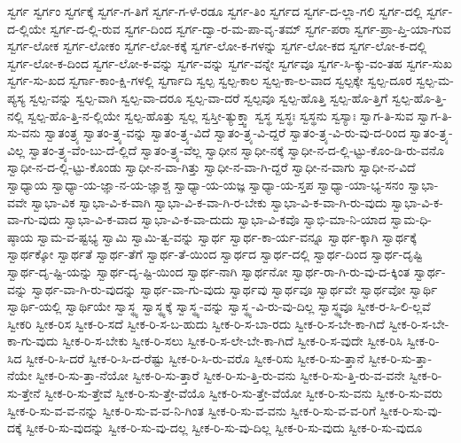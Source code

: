{ಸ್ವರ್ಗ
ಸ್ವರ್ಗಂ
ಸ್ವರ್ಗಕ್ಕೆ
ಸ್ವರ್ಗ-ಗ-ತಿಗೆ
ಸ್ವರ್ಗ-ಗ-ಳೆ-ರಡೂ
ಸ್ವರ್ಗ-ತಿಂ
ಸ್ವರ್ಗದ
ಸ್ವರ್ಗ-ದ-ಲ್ಲಾ-ಗಲಿ
ಸ್ವರ್ಗ-ದಲ್ಲಿ
ಸ್ವರ್ಗ-ದ-ಲ್ಲಿಯೇ
ಸ್ವರ್ಗ-ದ-ಲ್ಲಿ-ರುವ
ಸ್ವರ್ಗ-ದಿಂದ
ಸ್ವರ್ಗ-ದ್ವಾ-ರ-ಮ-ಪಾ-ವೃ-ತಮ್
ಸ್ವರ್ಗ-ಪರಾ
ಸ್ವರ್ಗ-ಪ್ರಾ-ಪ್ತಿ-ಯಾ-ಗುವ
ಸ್ವರ್ಗ-ಲೋಕ
ಸ್ವರ್ಗ-ಲೋಕಂ
ಸ್ವರ್ಗ-ಲೋ-ಕಕ್ಕೆ
ಸ್ವರ್ಗ-ಲೋ-ಕ-ಗಳನ್ನು
ಸ್ವರ್ಗ-ಲೋ-ಕದ
ಸ್ವರ್ಗ-ಲೋ-ಕ-ದಲ್ಲಿ
ಸ್ವರ್ಗ-ಲೋ-ಕ-ದಿಂದ
ಸ್ವರ್ಗ-ಲೋ-ಕ-ವನ್ನು
ಸ್ವರ್ಗ-ವನ್ನು
ಸ್ವರ್ಗ-ವನ್ನೇ
ಸ್ವರ್ಗವೂ
ಸ್ವರ್ಗ-ಸಿ-ಕ್ಕು-ವಂ-ತಹ
ಸ್ವರ್ಗ-ಸುಖ
ಸ್ವರ್ಗ-ಸು-ಖದ
ಸ್ವರ್ಗಾ-ಕಾಂ-ಕ್ಷಿ-ಗಳಲ್ಲಿ
ಸ್ವರ್ಗಾದಿ
ಸ್ವಲ್ಪ
ಸ್ವಲ್ಪ-ಕಾಲ
ಸ್ವಲ್ಪ-ಕಾ-ಲ-ವಾದ
ಸ್ವಲ್ಪಕ್ಕೇ
ಸ್ವಲ್ಪ-ದೂರ
ಸ್ವಲ್ಪ-ಮ-ಪ್ಯಸ್ಯ
ಸ್ವಲ್ಪ-ವನ್ನು
ಸ್ವಲ್ಪ-ವಾಗಿ
ಸ್ವಲ್ಪ-ವಾ-ದರೂ
ಸ್ವಲ್ಪ-ವಾ-ದರೆ
ಸ್ವಲ್ಪವೂ
ಸ್ವಲ್ಪ-ಹೊತ್ತಿ
ಸ್ವಲ್ಪ-ಹೊ-ತ್ತಿಗೆ
ಸ್ವಲ್ಪ-ಹೊ-ತ್ತಿ-ನಲ್ಲಿ
ಸ್ವಲ್ಪ-ಹೊ-ತ್ತಿ-ನ-ಲ್ಲಿಯೇ
ಸ್ವಲ್ಪ-ಹೊತ್ತು
ಸ್ವಲ್ಲ
ಸ್ವಸ್ತೀ-ತ್ಯುಕ್ತ್ವಾ
ಸ್ವಸ್ಥ
ಸ್ವಸ್ಥಃ
ಸ್ವಸ್ಥನು
ಸ್ವಸ್ಯಾಃ
ಸ್ವಾಗ-ತಿ-ಸುವ
ಸ್ವಾಗ-ತಿ-ಸು-ವನು
ಸ್ವಾತಂತ್ರ್ಯ
ಸ್ವಾತಂ-ತ್ರ್ಯ-ವನ್ನು
ಸ್ವಾತಂ-ತ್ರ್ಯ-ವಿದೆ
ಸ್ವಾತಂ-ತ್ರ್ಯ-ವಿ-ದ್ದರೆ
ಸ್ವಾತಂ-ತ್ರ್ಯ-ವಿ-ರು-ವು-ದ-ರಿಂದ
ಸ್ವಾತಂ-ತ್ರ್ಯ-ವಿಲ್ಲ
ಸ್ವಾತಂ-ತ್ರ್ಯ-ವೆಂ-ಬು-ದೆ-ಲ್ಲಿದೆ
ಸ್ವಾತಂ-ತ್ರ್ಯ-ವೆಲ್ಲ
ಸ್ವಾಧೀನ
ಸ್ವಾಧೀ-ನಕ್ಕೆ
ಸ್ವಾಧೀ-ನ-ದ-ಲ್ಲಿ-ಟ್ಟು-ಕೊಂ-ಡಿ-ರು-ವನೊ
ಸ್ವಾಧೀ-ನ-ದ-ಲ್ಲಿ-ಟ್ಟು-ಕೊಂಡು
ಸ್ವಾಧೀ-ನ-ವಾ-ಗಿತ್ತು
ಸ್ವಾಧೀ-ನ-ವಾ-ಗಿ-ದ್ದರೆ
ಸ್ವಾಧೀ-ನ-ವಾಗು
ಸ್ವಾಧೀ-ನ-ವಿದೆ
ಸ್ವಾಧ್ಯಾಯ
ಸ್ವಾಧ್ಯಾ-ಯ-ಜ್ಞಾ-ನ-ಯ-ಜ್ಞಾಶ್ಚ
ಸ್ವಾಧ್ಯಾ-ಯ-ಯಜ್ಞ
ಸ್ವಾಧ್ಯಾ-ಯ-ಸ್ತಪ
ಸ್ವಾಧ್ಯಾ-ಯಾ-ಭ್ಯ-ಸನಂ
ಸ್ವಾಭಾ-ವವೇ
ಸ್ವಾಭಾ-ವಿಕ
ಸ್ವಾಭಾ-ವಿ-ಕ-ವಾಗಿ
ಸ್ವಾಭಾ-ವಿ-ಕ-ವಾ-ಗಿ-ರ-ಬೇಕು
ಸ್ವಾಭಾ-ವಿ-ಕ-ವಾ-ಗಿ-ರು-ವುದು
ಸ್ವಾಭಾ-ವಿ-ಕ-ವಾ-ಗು-ವುದು
ಸ್ವಾಭಾ-ವಿ-ಕ-ವಾದ
ಸ್ವಾಭಾ-ವಿ-ಕ-ವಾ-ದುದು
ಸ್ವಾಭಾ-ವಿ-ಕವೊ
ಸ್ವಾಭಿ-ಮಾ-ನಿ-ಯಾದ
ಸ್ವಾಮ-ಧಿ-ಷ್ಠಾಯ
ಸ್ವಾಮ-ವ-ಷ್ಟಭ್ಯ
ಸ್ವಾಮಿ
ಸ್ವಾಮಿ-ತ್ವ-ವನ್ನು
ಸ್ವಾರ್ಥ
ಸ್ವಾರ್ಥ-ಕಾ-ರ್ಯ-ವನ್ನೂ
ಸ್ವಾರ್ಥ-ಕ್ಕಾಗಿ
ಸ್ವಾರ್ಥಕ್ಕೆ
ಸ್ವಾರ್ಥಕ್ಕೋ
ಸ್ವಾರ್ಥತೆ
ಸ್ವಾರ್ಥ-ತೆಗೆ
ಸ್ವಾರ್ಥ-ತೆ-ಯಿಂದ
ಸ್ವಾರ್ಥದ
ಸ್ವಾರ್ಥ-ದಲ್ಲಿ
ಸ್ವಾರ್ಥ-ದಿಂದ
ಸ್ವಾರ್ಥ-ದೃಷ್ಟಿ
ಸ್ವಾರ್ಥ-ದೃ-ಷ್ಟಿ-ಯನ್ನು
ಸ್ವಾರ್ಥ-ದೃ-ಷ್ಟಿ-ಯಿಂದ
ಸ್ವಾರ್ಥ-ನಾಗಿ
ಸ್ವಾರ್ಥನೋ
ಸ್ವಾರ್ಥ-ರಾ-ಗಿ-ರು-ವು-ದ-ಕ್ಕಿಂತ
ಸ್ವಾರ್ಥ-ವನ್ನು
ಸ್ವಾರ್ಥ-ವಾ-ಗಿ-ರು-ವುದನ್ನು
ಸ್ವಾರ್ಥ-ವಾ-ಗು-ವುದು
ಸ್ವಾರ್ಥವು
ಸ್ವಾರ್ಥವೂ
ಸ್ವಾರ್ಥವೇ
ಸ್ವಾರ್ಥವೋ
ಸ್ವಾರ್ಥಿ
ಸ್ವಾರ್ಥಿ-ಯಲ್ಲಿ
ಸ್ವಾರ್ಥಿಯೇ
ಸ್ವಾಸ್ಥ್ಯ
ಸ್ವಾಸ್ಥ್ಯಕ್ಕೆ
ಸ್ವಾಸ್ಥ್ಯ-ವನ್ನು
ಸ್ವಾಸ್ಥ್ಯ-ವಿ-ರು-ವು-ದಿಲ್ಲ
ಸ್ವಾಸ್ಥ್ಯವೂ
ಸ್ವೀಕ-ರ-ಸಿ-ಲಿ-ಲ್ಲವೆ
ಸ್ವೀಕರಿ
ಸ್ವೀಕ-ರಿಸ
ಸ್ವೀಕ-ರಿ-ಸದೆ
ಸ್ವೀಕ-ರಿ-ಸ-ಬ-ಹುದು
ಸ್ವೀಕ-ರಿ-ಸ-ಬಾ-ರದು
ಸ್ವೀಕ-ರಿ-ಸ-ಬೇ-ಕಾ-ಗಿದೆ
ಸ್ವೀಕ-ರಿ-ಸ-ಬೇ-ಕಾ-ಗು-ವುದು
ಸ್ವೀಕ-ರಿ-ಸ-ಬೇಕು
ಸ್ವೀಕ-ರಿ-ಸಲು
ಸ್ವೀಕ-ರಿ-ಸ-ಲೇ-ಬೇ-ಕಾ-ಗಿದೆ
ಸ್ವೀಕ-ರಿ-ಸ-ವುದೇ
ಸ್ವೀಕ-ರಿಸಿ
ಸ್ವೀಕ-ರಿ-ಸಿದ
ಸ್ವೀಕ-ರಿ-ಸಿ-ದರೆ
ಸ್ವೀಕ-ರಿ-ಸಿ-ದ-ರೆಷ್ಟು
ಸ್ವೀಕ-ರಿ-ಸಿ-ರು-ವರೊ
ಸ್ವೀಕ-ರಿಸು
ಸ್ವೀಕ-ರಿ-ಸು-ತ್ತಾನೆ
ಸ್ವೀಕ-ರಿ-ಸು-ತ್ತಾ-ನೆಯೇ
ಸ್ವೀಕ-ರಿ-ಸು-ತ್ತಾ-ನೆಯೋ
ಸ್ವೀಕ-ರಿ-ಸು-ತ್ತಾರೆ
ಸ್ವೀಕ-ರಿ-ಸು-ತ್ತಿ-ರು-ವನು
ಸ್ವೀಕ-ರಿ-ಸು-ತ್ತಿ-ರು-ವ-ವನೇ
ಸ್ವೀಕ-ರಿ-ಸು-ತ್ತೇನೆ
ಸ್ವೀಕ-ರಿ-ಸು-ತ್ತೇವೆ
ಸ್ವೀಕ-ರಿ-ಸು-ತ್ತೇ-ವೆಯೊ
ಸ್ವೀಕ-ರಿ-ಸು-ತ್ತೇ-ವೆಯೋ
ಸ್ವೀಕ-ರಿ-ಸು-ವನು
ಸ್ವೀಕ-ರಿ-ಸು-ವರು
ಸ್ವೀಕ-ರಿ-ಸು-ವ-ವ-ನನ್ನು
ಸ್ವೀಕ-ರಿ-ಸು-ವ-ವ-ನಿ-ಗಿಂತ
ಸ್ವೀಕ-ರಿ-ಸು-ವ-ವನು
ಸ್ವೀಕ-ರಿ-ಸು-ವ-ವ-ರಿಗೆ
ಸ್ವೀಕ-ರಿ-ಸು-ವು-ದಕ್ಕೆ
ಸ್ವೀಕ-ರಿ-ಸು-ವುದನ್ನು
ಸ್ವೀಕ-ರಿ-ಸು-ವು-ದಲ್ಲ
ಸ್ವೀಕ-ರಿ-ಸು-ವು-ದಿಲ್ಲ
ಸ್ವೀಕ-ರಿ-ಸು-ವುದು
ಸ್ವೀಕ-ರಿ-ಸು-ವುದೂ
}
